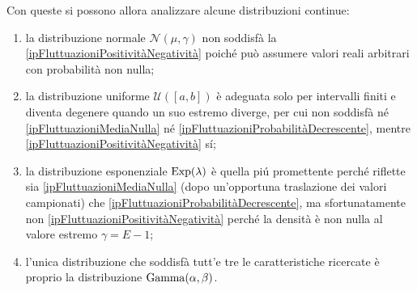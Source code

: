                 Con queste si possono allora analizzare alcune distribuzioni continue:

                \begin{enumerate}[
                    label=\arabic*.,
                ]
                    \item la distribuzione normale \(\mathcal N(\mu,\gamma)\) non soddisfà la \ref{ipFluttuazioniPositivitàNegatività} poiché può assumere valori reali arbitrari con probabilità non nulla;
                    \item la distribuzione uniforme \(\mathcal U([a,b])\) è adeguata solo per intervalli finiti e diventa degenere quando un suo estremo diverge, per cui non soddisfà né \ref{ipFluttuazioniMediaNulla} né \ref{ipFluttuazioniProbabilitàDecrescente}, mentre \ref{ipFluttuazioniPositivitàNegatività} sí;
                    \item la distribuzione esponenziale \(\operatorname{Exp}(\lambda)\) è quella piú promettente perché riflette sia \ref{ipFluttuazioniMediaNulla} (dopo un'opportuna traslazione dei valori campionati) che \ref{ipFluttuazioniProbabilitàDecrescente}, ma sfortunatamente non \ref{ipFluttuazioniPositivitàNegatività} perché la densità è non nulla al valore estremo \(\gamma=E-1\);
                    \item l'unica distribuzione che soddisfà tutt'e tre le caratteristiche ricercate è proprio la distribuzione \(\operatorname{Gamma}(\alpha,\beta)\).
                \end{enumerate}

